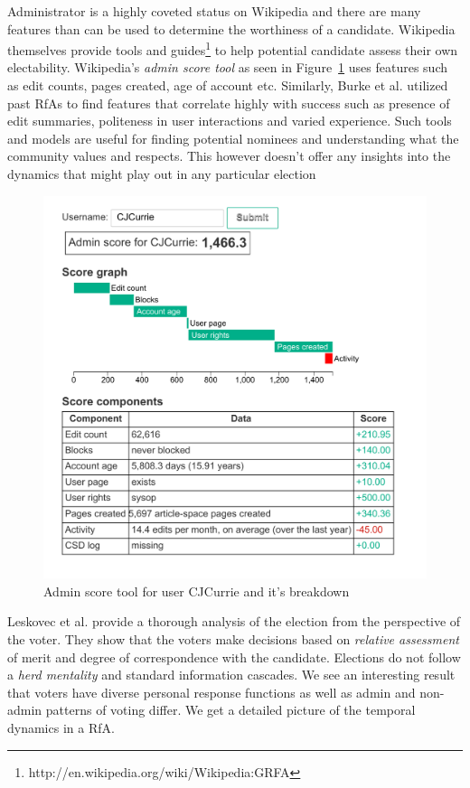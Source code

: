 Administrator is a highly coveted status on Wikipedia and there are many features than can be used to determine the worthiness of a candidate. Wikipedia themselves provide tools and guides\footnote{http://en.wikipedia.org/wiki/Wikipedia:GRFA} to help potential candidate assess their own electability. Wikipedia's \textit{admin score tool} as seen in Figure~\ref{fig:admin-score} uses features such as edit counts, pages created, age of account etc. Similarly, Burke et al. \cite{BurkeMoppingUp} utilized past RfAs to find features that correlate highly with success such as presence of edit summaries, politeness in user interactions and varied experience. Such tools and models are useful for finding potential nominees and understanding what the community values and respects. This however doesn't offer any insights into the dynamics that might play out in any particular election
\begin{figure}[h!]
    \centering
    \includegraphics[width=\linewidth]{images/Asynchronous Admin Score.pdf}
    \caption{Admin score tool for user CJCurrie and it's breakdown}
    \label{fig:admin-score}
\end{figure}

Leskovec et al. provide a thorough analysis of the election from the perspective of the voter. They show that the voters make decisions based on \textit{relative assessment} of merit and degree of correspondence with the candidate. Elections do not follow a \textit{herd mentality} and standard information cascades. We see an interesting result that voters have diverse personal response functions as well as admin and non-admin patterns of voting differ. \cite{leskovec2010governance} We get a detailed picture of the temporal dynamics in a RfA.

